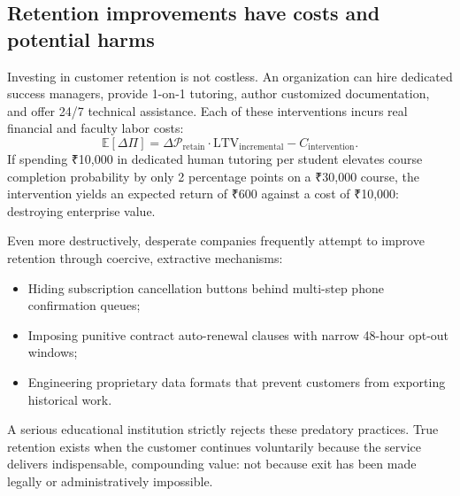 \subsection{Retention improvements have costs and potential harms}

Investing in customer retention is not costless. An organization can hire dedicated success managers, provide 1-on-1 tutoring, author customized documentation, and offer 24/7 technical assistance. Each of these interventions incurs real financial and faculty labor costs:
\begin{equation}
\mathbb{E}[\Delta \Pi] = \Delta \mathcal{P}_{\text{retain}} \cdot \text{LTV}_{\text{incremental}} - C_{\text{intervention}}.
\end{equation}
If spending ₹10,000 in dedicated human tutoring per student elevates course completion probability by only 2 percentage points on a ₹30,000 course, the intervention yields an expected return of ₹600 against a cost of ₹10,000: destroying enterprise value.

Even more destructively, desperate companies frequently attempt to improve retention through coercive, extractive mechanisms:
\begin{itemize}
\item Hiding subscription cancellation buttons behind multi-step phone confirmation queues;
\item Imposing punitive contract auto-renewal clauses with narrow 48-hour opt-out windows;
\item Engineering proprietary data formats that prevent customers from exporting historical work.
\end{itemize}
A serious educational institution strictly rejects these predatory practices. True retention exists when the customer continues voluntarily because the service delivers indispensable, compounding value: not because exit has been made legally or administratively impossible.
